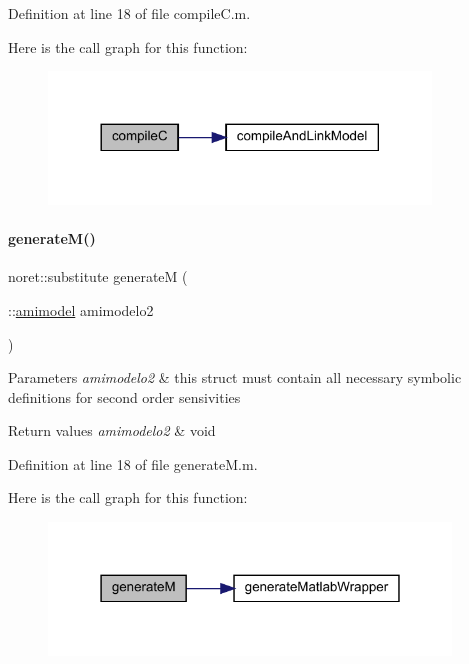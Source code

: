 Definition at line 18 of file compile\+C.\+m.

Here is the call graph for this function\+:
\nopagebreak
\begin{figure}[H]
\begin{center}
\leavevmode
\includegraphics[width=288pt]{classamimodel_abf720a0c3104977029538e3b19d429bb_cgraph}
\end{center}
\end{figure}
\mbox{\label{classamimodel_a6e93ea24824d9d90c322960e6d78fed0}} 
\paragraph{\texorpdfstring{generate\+M()}{generateM()}}
{\footnotesize\ttfamily noret\+::substitute generateM (\begin{DoxyParamCaption}\item[{\+::\mbox{\hyperlink{classamimodel}{amimodel}}}]{amimodelo2 }\end{DoxyParamCaption})}


\begin{DoxyParams}{Parameters}
{\em amimodelo2} & this struct must contain all necessary symbolic definitions for second order sensivities\\
\hline
\end{DoxyParams}

\begin{DoxyRetVals}{Return values}
{\em amimodelo2} & void \\
\hline
\end{DoxyRetVals}


Definition at line 18 of file generate\+M.\+m.

Here is the call graph for this function\+:
\nopagebreak
\begin{figure}[H]
\begin{center}
\leavevmode
\includegraphics[width=303pt]{classamimodel_a6e93ea24824d9d90c322960e6d78fed0_cgraph}
\end{center}
\end{figure}
\mbox{\label{classamimodel_a08d58ae650e5ff9310760f6d3f08015c}} 
